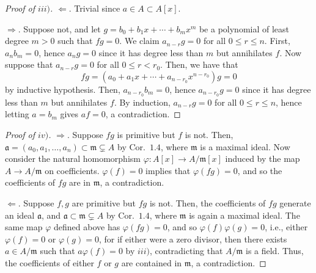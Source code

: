 \documentclass[12pt,letterpaper]{article}
\theoremstyle{definition}
\theoremstyle{remark}
\numberwithin{figure}{problem}
\numberwithin{equation}{section}
\begin{document}
\begin{proof}[Proof of
  $iii)$]
  $\Leftarrow$.
  Trivial since
  $a \in A \subset
  A[x]$.
  \par
  $\Rightarrow$.
  Suppose not, and let
  $g = b_0 + b_1x + \cdots +
  b_mx^m$ be a polynomial of least degree
  $m >
  0$ such that
  $fg =
  0$.
  We claim
  $a_{n-r}g =
  0$ for all
  $0 \le r \le
  n$.
  First,
  $a_nb_m=0$, hence
  $a_ng =
  0$ since it has degree less than
  $m$ but annihilates
  $f$.
  Now suppose that
  $a_{n-r}g =
  0$ for all
  $0 \le r <
  r_0$.
  Then, we have that
  \begin{equation*}
    fg = \left(a_0 + a_1x + \cdots + a_{n-r_0}x^{n-r_0}\right)g = 0
  \end{equation*}
  by inductive hypothesis.
  Then,
  $a_{n-r_0}b_m =
  0$, hence
  $a_{n-r_0}g =
  0$ since it has degree less than
  $m$ but annihilates
  $f$.
  By induction,
  $a_{n-r}g =
  0$ for all
  $0 \le r \le
  n$, hence letting
  $a =
  b_m$ gives
  $af =
  0$, a contradiction.
\end{proof}
\begin{proof}[Proof of
  $iv)$]
  $\Rightarrow$.
  Suppose
  $fg$ is primitive but
  $f$ is not.
  Then,
  $\mathfrak{a} = (a_0,a_1,\ldots,a_n) \subset \mathfrak{m} \subsetneq
  A$ by
  Cor.~$1.4$, where
  $\mathfrak{m}$ is a maximal ideal.
  Now consider the natural homomorphism
  $\varphi\colon A[x] \to
  A/\mathfrak{m}[x]$ induced by the map
  $A \to
  A/\mathfrak{m}$ on coefficients.
  $\varphi(f) =
  0$ implies that
  $\varphi(fg) =
  0$, and so the coefficients of
  $fg$ are in
  $\mathfrak{m}$, a contradiction.
  \par
  $\Leftarrow$.
  Suppose
  $f,g$ are primitive but
  $fg$ is not.
  Then, the coefficients of
  $fg$ generate an ideal
  $\mathfrak{a}$, and
  $\mathfrak{a} \subset \mathfrak{m} \subsetneq
  A$ by
  Cor.~$1.4$, where
  $\mathfrak{m}$ is again a maximal ideal.
  The same map
  $\varphi$ defined above has
  $\varphi(fg) =
  0$, and so
  $\varphi(f)\varphi(g) =
  0$, i.e., either
  $\varphi(f) =
  0$ or
  $\varphi(g) =
  0$, for if either were a zero divisor, then there exists
  $a \in
  A/\mathfrak{m}$ such that
  $a\varphi(f) =
  0$ by
  $iii)$, contradicting that
  $A/\mathfrak{m}$ is a field.
  Thus, the coefficients of either
  $f$ or
  $g$ are contained in
  $\mathfrak{m}$, a contradiction.
\end{proof}
\end{document}

